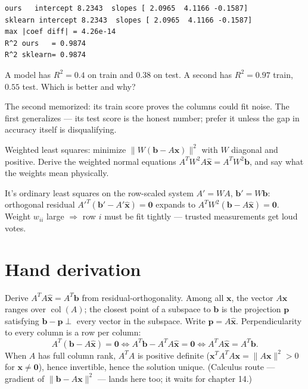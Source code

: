 \begin{lstlisting}[caption={Output of the capstone. Notice the
coefficients agree to machine precision --- least squares via QR IS what
the library computes, and your implementation is the real thing, not a
toy.}]
ours   intercept 8.2343  slopes [ 2.0965  4.1166 -0.1587]
sklearn intercept 8.2343  slopes [ 2.0965  4.1166 -0.1587]
max |coef diff| = 4.26e-14
R^2 ours   = 0.9874
R^2 sklearn= 0.9874
\end{lstlisting}

\begin{exercise}[easy]
A model has $R^{2}=0.4$ on train and $0.38$ on test. A second has
$R^{2}=0.97$ train, $0.55$ test. Which is better and why?
\begin{solution}
The second memorized: its train score proves the columns could fit noise.
The first generalizes --- its test score is the honest number; prefer it
unless the gap in accuracy itself is disqualifying.
\end{solution}
\end{exercise}

\begin{exercise}
Weighted least squares: minimize
$\lVert W(\mathbf b-A\mathbf x)\rVert^{2}$ with $W$ diagonal and positive.
Derive the weighted normal equations
$A^{T}W^{2}A\hat{\mathbf x}=A^{T}W^{2}\mathbf b$, and say what the weights
mean physically.
\begin{solution}
It's ordinary least squares on the row-scaled system
$A'=WA$, $\mathbf b'=W\mathbf b$: orthogonal residual
$A'^{T}(\mathbf b'-A'\hat{\mathbf x})=\mathbf0$ expands to
$A^{T}W^{2}(\mathbf b-A\hat{\mathbf x})=\mathbf0$.
Weight $w_{ii}$ large $\Rightarrow$ row $i$ must be fit tightly ---
trusted measurements get loud votes.
\end{solution}
\end{exercise}

\section{Hand derivation}\label{sec:handderiv8}

Derive $A^{T}A\hat{\mathbf x}=A^{T}\mathbf b$ from
residual-orthogonality. Among all $\mathbf x$, the vector
$A\mathbf x$ ranges over $\operatorname{col}(A)$; the closest point of a
subspace to $\mathbf b$ is the projection $\mathbf p$ satisfying
$\mathbf b-\mathbf p\perp$ every vector in the subspace. Write
$\mathbf p=A\hat{\mathbf x}$. Perpendicularity to every column is a row
per column:
\[
A^{T}(\mathbf b-A\hat{\mathbf x})=\mathbf0
\iff A^{T}\mathbf b-A^{T}A\hat{\mathbf x}=\mathbf0
\iff A^{T}A\hat{\mathbf x}=A^{T}\mathbf b .
\]
When $A$ has full column rank, $A^{T}A$ is positive definite
($\mathbf x^{T}A^{T}A\mathbf x=\lVert A\mathbf x\rVert^{2}>0$ for
$\mathbf x\ne\mathbf0$), hence invertible, hence the solution unique.
(Calculus route --- gradient of $\lVert\mathbf b-A\mathbf x\rVert^{2}$ ---
lands here too; it waits for chapter 14.)

